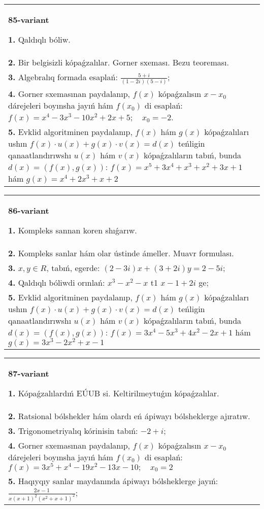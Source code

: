 \documentclass{article}
\begin{document}
\begin{tabular}{m{17cm}}
\textbf{85-variant}
\newline

\textbf{1.} Qaldıqlı bóliw.  \\
\textbf{2.} Bir belgisizli kópaǵzalılar. Gorner sxeması. Bezu teoreması.  \\
\textbf{3.} Algebralıq formada esaplań: $\frac{5+i}{(1-2 i)(5-i)}$; \\
\textbf{4.} Gorner sxemasınan paydalanıp, $f(x)$ kópaǵzalısın $x-x_0$ dárejeleri boyınsha jayıń hám $f\left(x_0\right)$ di esaplań: $f(x)=x^4-3 x^3-10 x^2+2 x+5 ; \quad x_0=-2$. \\
\textbf{5.} Evklid algoritminen paydalanıp, $f(x)$ hám $g(x)$ kópaǵzalıları ushın $f(x) \cdot u(x)+g(x) \cdot v(x)=d(x)$ teńligin qanaatlandırıwshı $u(x)$ hám $v(x)$ kópaǵzalıların tabıń, bunda $d(x)=(f(x), g(x))$:  $f(x)=x^5+3 x^4+x^3+x^2+3 x+1$ hám $g(x)=x^4+2 x^3+x+2$ \\

\end{tabular}
\vspace{1cm}


\begin{tabular}{m{17cm}}
\textbf{86-variant}
\newline

\textbf{1.} Kompleks sannan koren shıǵarıw. \\
\textbf{2.} Kompleks sanlar hám olar ústinde ámeller. Muavr formulası.  \\
\textbf{3.}  $x, y \in R$, tabıń, egerde: $(2-3 i) x+(3+2 i) y=2-5 i$; \\
\textbf{4.} Qaldıqlı bóliwdi orınlań:  $x^3-x^2-x$ t1 $x-1+2 i$ ge; \\
\textbf{5.} Evklid algoritminen paydalanıp, $f(x)$ hám $g(x)$ kópaǵzalıları ushın $f(x) \cdot u(x)+g(x) \cdot v(x)=d(x)$ teńligin qanaatlandırıwshı $u(x)$ hám $v(x)$ kópaǵzalıların tabıń, bunda $d(x)=(f(x), g(x))$:  $f(x)=3 x^4-5 x^3+4 x^2-2 x+1$ hám $g(x)=3 x^3-2 x^2+x-1$ \\

\end{tabular}
\vspace{1cm}


\begin{tabular}{m{17cm}}
\textbf{87-variant}
\newline

\textbf{1.} Kópaǵzalılardıń EÚUB si. Keltirilmeytuǵın   kópaǵzalılar. \\
\textbf{2.} Ratsional bólshekler hám olardı eń ápiwayı bólsheklerge ajıratıw. \\
\textbf{3.} Trigonometriyalıq kórinisin tabıń: $-2+i$; \\
\textbf{4.} Gorner sxemasınan paydalanıp, $f(x)$ kópaǵzalısın $x-x_0$ dárejeleri boyınsha jayıń hám $f\left(x_0\right)$ di esaplań: $f(x)=3 x^5+x^4-19 x^2-13 x-10 ; \quad x_0=2$ \\
\textbf{5.} Haqıyqıy sanlar maydanında ápiwayı bólsheklerge jayıń:  $\frac{2 x-1}{x(x+1)^2\left(x^2+x+1\right)^2}$; \\

\end{tabular}
\vspace{1cm}
\end{document}
